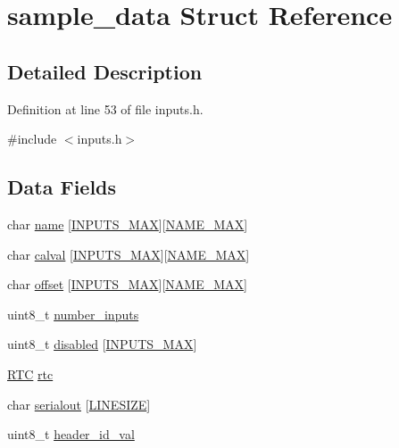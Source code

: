 \hypertarget{structsample__data}{\section{sample\-\_\-data Struct Reference}
\label{structsample__data}
}


\subsection{Detailed Description}


Definition at line 53 of file inputs.\-h.



{\ttfamily \#include $<$inputs.\-h$>$}

\subsection*{Data Fields}
\begin{DoxyCompactItemize}
\item 
char \hyperlink{structsample__data_ad7e5e24f779c9d9683fee404e3b63e21}{name} \mbox{[}\hyperlink{data__legnths_8h_a116720fa0b96a427ee416226b7bf728b}{I\-N\-P\-U\-T\-S\-\_\-\-M\-A\-X}\mbox{]}\mbox{[}\hyperlink{data__legnths_8h_ac64541bdd81c961304b9babef1402640}{N\-A\-M\-E\-\_\-\-M\-A\-X}\mbox{]}
\item 
char \hyperlink{structsample__data_ae968c47b8184f1c4f8eac40afcdd40d2}{calval} \mbox{[}\hyperlink{data__legnths_8h_a116720fa0b96a427ee416226b7bf728b}{I\-N\-P\-U\-T\-S\-\_\-\-M\-A\-X}\mbox{]}\mbox{[}\hyperlink{data__legnths_8h_ac64541bdd81c961304b9babef1402640}{N\-A\-M\-E\-\_\-\-M\-A\-X}\mbox{]}
\item 
char \hyperlink{structsample__data_a4c30d8a850f9c106f5614849386d498e}{offset} \mbox{[}\hyperlink{data__legnths_8h_a116720fa0b96a427ee416226b7bf728b}{I\-N\-P\-U\-T\-S\-\_\-\-M\-A\-X}\mbox{]}\mbox{[}\hyperlink{data__legnths_8h_ac64541bdd81c961304b9babef1402640}{N\-A\-M\-E\-\_\-\-M\-A\-X}\mbox{]}
\item 
uint8\-\_\-t \hyperlink{structsample__data_aab5f5b842f431253c223d01ba22fef55}{number\-\_\-inputs}
\item 
uint8\-\_\-t \hyperlink{structsample__data_a43021cf4232112c0be0deb325252da5d}{disabled} \mbox{[}\hyperlink{data__legnths_8h_a116720fa0b96a427ee416226b7bf728b}{I\-N\-P\-U\-T\-S\-\_\-\-M\-A\-X}\mbox{]}
\item 
\hyperlink{structRTC}{R\-T\-C} \hyperlink{structsample__data_abc7bac4a5c01e9effcf9f33a42f57f06}{rtc}
\item 
char \hyperlink{structsample__data_af18460f06968c075db59516a21c409a7}{serialout} \mbox{[}\hyperlink{data__legnths_8h_a0095c1e0ae26941efea12c77f2232f2f}{L\-I\-N\-E\-S\-I\-Z\-E}\mbox{]}
\item 
uint8\-\_\-t \hyperlink{structsample__data_a4fcbf044732756a32052015ddeed0803}{header\-\_\-id\-\_\-val}
\end{DoxyCompactItemize}


